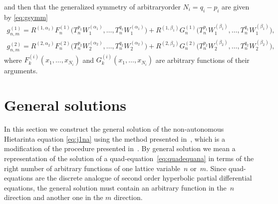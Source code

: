 \documentclass[pdftex]{sigma}
\numberwithin{equation}{section}
\begin{document}
and then that the generalized symmetry of arbitraryorder $N_{i}=q_{i}-p_{i}$ are given by \eqref{eq:gsymm}
 \begin{gather*}
 g^{(1)}_{n,m} =
 R^{(1,\alpha_{1})}
 {F}^{(1)}_{{n}} \big(T_{n}^{p_{1}}W_{1}^{(\alpha_{1})},\dots,T_{n}^{q_{1}} W_{1}^{(\alpha_{1})} \big)
+
R^{(1,\beta_{1})} {G}^{(1)}_{{n}} \big(T_{n}^{p_{1}}W_{1}^{(\beta_{1})},\dots,T_{n}^{q_{1}} W_{1}^{(\beta_{1})} \big), \\ %
 g^{(2)}_{n,m} =
 R^{(2,\alpha_{2})} {F}^{(2)}_{{n}} \big(T_{n}^{p_{2}}W_{2}^{(\alpha_{2})},\dots,T_{n}^{q_{2}} W_{2}^{(\alpha_{2})} \big)
+ R^{(2,\beta_{2})}
 {G}^{(2)}_{{n}} \big(T_{n}^{p_{2}}W_{2}^{(\beta_{2})},\dots,T_{n}^{q_{2}} W_{2}^{(\beta_{2})} \big), %
 \end{gather*}
where $F_{k}^{(i)}( x_{1},\dots,x_{N_{i}} )$ and $G_{k}^{(i)}( x_{1},\dots,x_{N_{i}})$ are arbitrary functions of their arguments.

\section{General solutions} \label{sec:sol}

In this section we construct the general solution of the non-autonomous Hietarinta equa\-tion \eqref{eq:j1na} using the method presented in~\cite{GSY_DarbouxII, GSY_DarbouxI}, which is a modif\/ication of the procedure presented in~\cite{GarifullinYamilov2012}.
By general solution we mean a representation of the solution of a quad-equation~\eqref{eq:quadequana} in terms of the right number of arbitrary functions of one lattice variable~$n$ or~$m$.
Since quad-equations are the discrete analogue of
second order hyperbolic partial dif\/ferential equations,
the general solution must contain an arbitrary function
in the~$n$ direction and another one in the $m$ direction.
\end{document}
